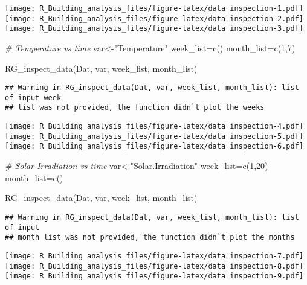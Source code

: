 \documentclass[
]{article}
\newenvironment{Shaded}{\begin{snugshade}}{\end{snugshade}}
\newcommand{\CommentTok}[1]{\textcolor[rgb]{0.56,0.35,0.01}{\textit{#1}}}
\newcommand{\DecValTok}[1]{\textcolor[rgb]{0.00,0.00,0.81}{#1}}
\newcommand{\FunctionTok}[1]{\textcolor[rgb]{0.00,0.00,0.00}{#1}}
\newcommand{\NormalTok}[1]{#1}
\newcommand{\OtherTok}[1]{\textcolor[rgb]{0.56,0.35,0.01}{#1}}
\newcommand{\StringTok}[1]{\textcolor[rgb]{0.31,0.60,0.02}{#1}}
\begin{document}
\texttt{[image: R\_Building\_analysis\_files/figure-latex/data inspection-1.pdf]}
\texttt{[image: R\_Building\_analysis\_files/figure-latex/data inspection-2.pdf]}
\texttt{[image: R\_Building\_analysis\_files/figure-latex/data inspection-3.pdf]}

\begin{Shaded}
\begin{Highlighting}[]
  \CommentTok{\# Temperature vs time}
\NormalTok{  var}\OtherTok{\textless{}{-}}\StringTok{"Temperature"}
\NormalTok{  week\_list}\OtherTok{=}\FunctionTok{c}\NormalTok{()}
\NormalTok{  month\_list}\OtherTok{=}\FunctionTok{c}\NormalTok{(}\DecValTok{1}\NormalTok{,}\DecValTok{7}\NormalTok{)}
  
  \FunctionTok{RG\_inspect\_data}\NormalTok{(Dat, var, week\_list, month\_list)}
\end{Highlighting}
\end{Shaded}

\begin{verbatim}
## Warning in RG_inspect_data(Dat, var, week_list, month_list): list of input week
## list was not provided, the function didn`t plot the weeks
\end{verbatim}

\texttt{[image: R\_Building\_analysis\_files/figure-latex/data inspection-4.pdf]}
\texttt{[image: R\_Building\_analysis\_files/figure-latex/data inspection-5.pdf]}
\texttt{[image: R\_Building\_analysis\_files/figure-latex/data inspection-6.pdf]}

\begin{Shaded}
\begin{Highlighting}[]
  \CommentTok{\# Solar Irradiation vs time}
\NormalTok{  var}\OtherTok{\textless{}{-}}\StringTok{"Solar.Irradiation"}
\NormalTok{  week\_list}\OtherTok{=}\FunctionTok{c}\NormalTok{(}\DecValTok{1}\NormalTok{,}\DecValTok{20}\NormalTok{)}
\NormalTok{  month\_list}\OtherTok{=}\FunctionTok{c}\NormalTok{()}
  
  \FunctionTok{RG\_inspect\_data}\NormalTok{(Dat, var, week\_list, month\_list)}
\end{Highlighting}
\end{Shaded}

\begin{verbatim}
## Warning in RG_inspect_data(Dat, var, week_list, month_list): list of input
## month list was not provided, the function didn`t plot the months
\end{verbatim}

\texttt{[image: R\_Building\_analysis\_files/figure-latex/data inspection-7.pdf]}
\texttt{[image: R\_Building\_analysis\_files/figure-latex/data inspection-8.pdf]}
\texttt{[image: R\_Building\_analysis\_files/figure-latex/data inspection-9.pdf]}
\end{document}
